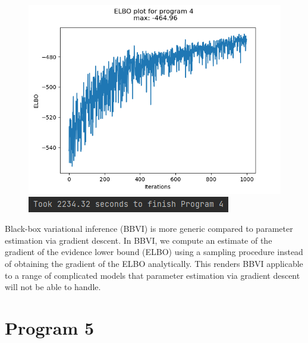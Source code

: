 \documentclass[10pt]{homeworg}
\begin{document}
\begin{figure}[!htbp]
    \centering
    \begin{minipage}{0.45\textwidth}
        \centering
       \includegraphics[scale=0.5]{figures/elbo_program_4.png}
    \end{minipage}\hfill
    \begin{minipage}{0.45\textwidth}
        \centering
        \includegraphics[scale=0.8]{figures/program4_time.png}
    \end{minipage}
\end{figure}


Black-box variational inference (BBVI) is more generic compared to parameter estimation via gradient descent. In BBVI, we compute an estimate of the gradient of the evidence lower bound (ELBO) using a sampling procedure instead of obtaining the gradient of the ELBO analytically. This renders BBVI applicable to a range of complicated models that parameter estimation via gradient descent will not be able to handle.


\section{Program 5}
\end{document}
